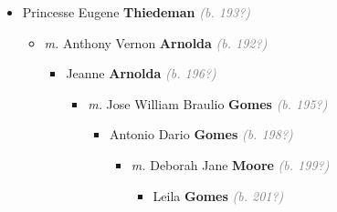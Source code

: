 \documentclass[10pt, openany]{book}
\begin{document}
\begin{itemize}
{\begin{itemize}
{\begin{itemize}
{\begin{itemize}
{\begin{itemize}
{\begin{itemize}
{ }
\item{Yasmin \textbf{Burke} \textcolor{gray}{\textit{(b. 199?)}}
 }
\end{itemize}}
\end{itemize}
 }
\item{Fazal \textbf{Cader} \textcolor{gray}{\textit{(b. 196?)}}
 }
\item{Rukshana \textbf{Cader} \textcolor{gray}{\textit{(b. 196?)}}
\begin{itemize}
\item{\textit{m.} Hans \textbf{Verzijl} \textcolor{gray}{\textit{(b. 195?)}}   \label{couple:00001916:00001917} \begin{itemize}
\item{Simeon \textbf{Verzijl} \textcolor{gray}{\textit{(b. 199?)}}
 }
\item{Ben \textbf{Verzijl} \textcolor{gray}{\textit{(b. 199?)}}
 }
\end{itemize}}
\end{itemize}
 }
\end{itemize}}
\end{itemize}
  }
\item{Princesse Eugene \textbf{Thiedeman} \textcolor{gray}{\textit{(b. 193?)}}
\begin{itemize}
\item{\textit{m.} Anthony Vernon \textbf{Arnolda} \textcolor{gray}{\textit{(b. 192?)}}   \label{couple:00001879:00001880} \begin{itemize}
\item{Jeanne \textbf{Arnolda} \textcolor{gray}{\textit{(b. 196?)}}
\begin{itemize}
\item{\textit{m.} Jose William Braulio \textbf{Gomes} \textcolor{gray}{\textit{(b. 195?)}}   \label{couple:00001881:00001882} \begin{itemize}
\item{Antonio Dario \textbf{Gomes} \textcolor{gray}{\textit{(b. 198?)}}
\begin{itemize}
\item{\textit{m.} Deborah Jane \textbf{Moore} \textcolor{gray}{\textit{(b. 199?)}}   \label{couple:00001883:00001884} \begin{itemize}
\item{Leila \textbf{Gomes} \textcolor{gray}{\textit{(b. 201?)}}
}
\end{itemize}}
\end{itemize}}
\end{itemize}}
\end{itemize}}
\end{itemize}}
\end{itemize}}
\end{itemize}}
\end{itemize}
\end{document}
